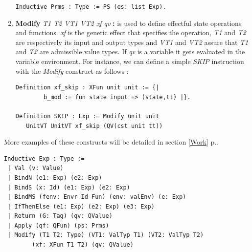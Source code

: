 \begin{enumerate}
\begin{lstlisting}[caption = {Function parameters in the deep embedding},xleftmargin=.05\textwidth,
xrightmargin=.12\textwidth]
Inductive Prms : Type := PS (es: list Exp).     
\end{lstlisting}	
\pagebreak
	\item \textbf{Modify} \textit{T1 T2 VT1 VT2 xf qv} \textbf{:} is used to define effectful state operations and functions. \textit{xf} is the generic effect that specifies the operation, \textit{T1} and \textit{T2} are respectively its input and output types and \textit{VT1} and \textit{VT2} assure that \textit{T1} and \textit{T2} are admissible value types. If \textit{qv} is a variable it gets evaluated in the variable environment. For instance, we can define a simple \textit{SKIP} instruction with the \textit{Modify} construct as follows :
\begin{lstlisting}[caption = {SKIP instruction in the deep embedding},xleftmargin=.02\textwidth,
xrightmargin=.02\textwidth]
Definition xf_skip : XFun unit unit := {|
        b_mod := fun state input => (state,tt) |}.
        
Definition SKIP : Exp := Modify unit unit 
   UnitVT UnitVT xf_skip (QV(cst unit tt))
\end{lstlisting}
\end{enumerate}
More examples of these constructs will be detailed in section \ref{Work} p.\pageref{Work}.
\begin{lstlisting}[caption = {Deep embedding expressions}, label={DeepEmb}]
Inductive Exp : Type :=
 | Val (v: Value)
 | BindN (e1: Exp) (e2: Exp) 
 | BindS (x: Id) (e1: Exp) (e2: Exp)
 | BindMS (fenv: Envr Id Fun) (env: valEnv) (e: Exp)
 | IfThenElse (e1: Exp) (e2: Exp) (e3: Exp) 
 | Return (G: Tag) (qv: QValue)
 | Apply (qf: QFun) (ps: Prms) 
 | Modify (T1 T2: Type) (VT1: ValTyp T1) (VT2: ValTyp T2)
 		(xf: XFun T1 T2) (qv: QValue)
\end{lstlisting}

